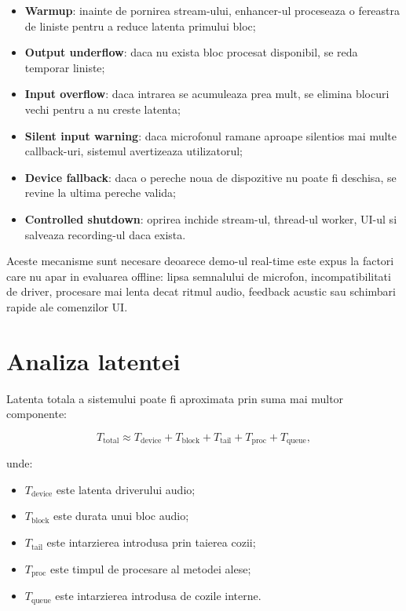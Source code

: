 \begin{itemize}
    \item \textbf{Warmup}: inainte de pornirea stream-ului, enhancer-ul proceseaza
    o fereastra de liniste pentru a reduce latenta primului bloc;
    \item \textbf{Output underflow}: daca nu exista bloc procesat disponibil,
    se reda temporar liniste;
    \item \textbf{Input overflow}: daca intrarea se acumuleaza prea mult, se
    elimina blocuri vechi pentru a nu creste latenta;
    \item \textbf{Silent input warning}: daca microfonul ramane aproape silentios
    mai multe callback-uri, sistemul avertizeaza utilizatorul;
    \item \textbf{Device fallback}: daca o pereche noua de dispozitive nu poate
    fi deschisa, se revine la ultima pereche valida;
    \item \textbf{Controlled shutdown}: oprirea inchide stream-ul, thread-ul
    worker, UI-ul si salveaza recording-ul daca exista.
\end{itemize}

Aceste mecanisme sunt necesare deoarece demo-ul real-time este expus la factori
care nu apar in evaluarea offline: lipsa semnalului de microfon, incompatibilitati
de driver, procesare mai lenta decat ritmul audio, feedback acustic sau schimbari
rapide ale comenzilor UI.

\section{Analiza latentei}

Latenta totala a sistemului poate fi aproximata prin suma mai multor componente:

\[
T_{\text{total}} \approx
T_{\text{device}} +
T_{\text{block}} +
T_{\text{tail}} +
T_{\text{proc}} +
T_{\text{queue}},
\]

unde:

\begin{itemize}
    \item \(T_{\text{device}}\) este latenta driverului audio;
    \item \(T_{\text{block}}\) este durata unui bloc audio;
    \item \(T_{\text{tail}}\) este intarzierea introdusa prin taierea cozii;
    \item \(T_{\text{proc}}\) este timpul de procesare al metodei alese;
    \item \(T_{\text{queue}}\) este intarzierea introdusa de cozile interne.
\end{itemize}

